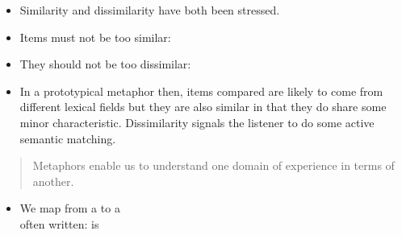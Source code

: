 \documentclass[headrule,footrule]{foils}
\begin{document}
\begin{itemize}
\item Similarity and dissimilarity have both been stressed.
\item Items must not be too similar:
  \begin{exe}
    \ex {}
    \ex {}
    \ex {}
  \end{exe}
\newpage
\item They should not be too dissimilar:
  \begin{exe}
    \ex {}
    \ex {}
    \ex {}
  \end{exe}
\item In a prototypical metaphor then, items compared are
likely to come from different lexical fields but they are
also similar in that they do share some minor
characteristic. Dissimilarity signals the listener to do
some active semantic matching.
\begin{exe}
  \ex {}
  \ex {}
  \ex {}
\end{exe}
\end{itemize}


\begin{quote}
 Metaphors enable us to understand one
  domain of experience in terms of another.
\\ \mbox{}\hfill \citet{Lakoff:Turner:1989}
\end{quote}

\begin{itemize}
\item We map from a  to a 
\\[1.5ex] often written:  is 
\end{itemize}





\end{document}
